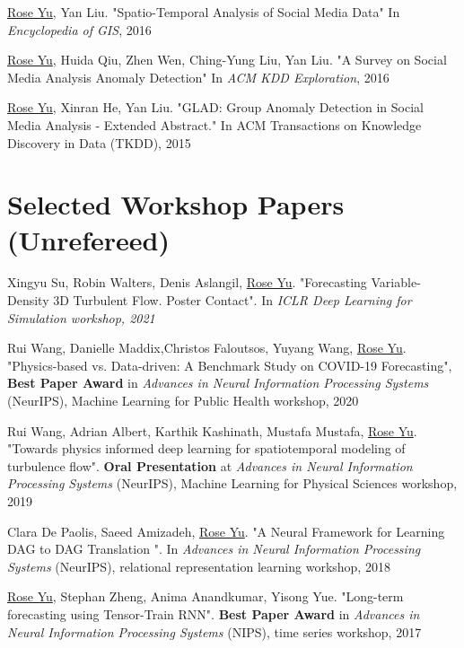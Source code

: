 \documentclass[margin,line]{res}
\begin{document}
\begin{resume}
\begin{enumerate}[label={[J\arabic*]}]
\item \underline{Rose Yu},  Yan Liu.  "Spatio-Temporal Analysis of Social Media Data"  In \textit{Encyclopedia of GIS}, 2016

\item \underline{Rose Yu}, Huida Qiu, Zhen Wen, Ching-Yung Liu,  Yan Liu. "A Survey on Social Media Analysis  Anomaly Detection" In \textit{ACM KDD Exploration},  2016

\item \underline{Rose Yu}, Xinran He, Yan Liu. "GLAD: Group Anomaly Detection in Social Media Analysis - Extended Abstract." In \textit{}ACM Transactions on Knowledge Discovery in Data  (TKDD), 2015
\end{enumerate}


 
\section{\sc Selected
Workshop
Papers
(Unrefereed) }
\begin{enumerate}[label={[W\arabic*]}]
\item Xingyu Su,  Robin Walters,  Denis Aslangil, \underline{Rose Yu}.
"Forecasting Variable-Density 3D Turbulent Flow. Poster Contact".  In \textit{ICLR Deep Learning for Simulation workshop, 2021}

\item Rui Wang, Danielle Maddix,Christos Faloutsos, Yuyang Wang, \underline{Rose Yu}. "Physics-based vs. Data-driven: A Benchmark Study on COVID-19 Forecasting",  \textbf{Best Paper Award}  in \textit{Advances in Neural Information Processing Systems} (NeurIPS), Machine Learning for Public Health workshop, 2020



\item Rui Wang, Adrian Albert, Karthik Kashinath, Mustafa Mustafa, \underline{Rose Yu}. "Towards physics informed deep learning for spatiotemporal modeling of turbulence flow". \textbf{Oral Presentation} at \textit{Advances in Neural Information Processing Systems} (NeurIPS), Machine Learning for Physical Sciences  workshop, 2019

\item Clara De Paolis, Saeed Amizadeh, \underline{Rose Yu}.  "A Neural Framework for Learning DAG to DAG Translation ". In  \textit{Advances in Neural Information Processing Systems} (NeurIPS), relational representation learning workshop, 2018

\item \underline{Rose Yu}, Stephan Zheng, Anima Anandkumar, Yisong Yue. "Long-term forecasting using Tensor-Train RNN". \textbf{Best Paper Award}  in \textit{Advances in Neural Information Processing Systems} (NIPS), time series workshop, 2017



\end{enumerate}
\end{resume}
\end{document}
